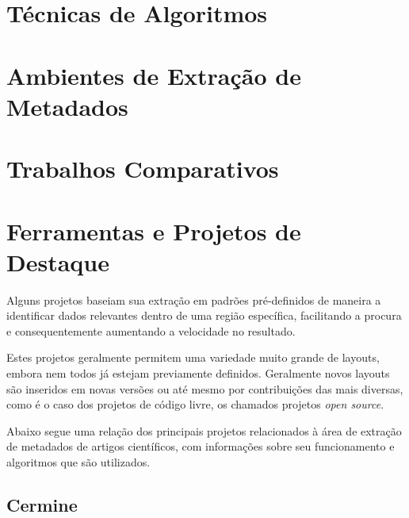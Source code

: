 \section{Técnicas de Algoritmos}

\section{Ambientes de Extração de Metadados}














\section{Trabalhos Comparativos}


\section{Ferramentas e Projetos de Destaque}

Alguns projetos baseiam sua extração em padrões pré-definidos de maneira a identificar dados relevantes dentro de uma região específica, facilitando a procura e consequentemente aumentando a velocidade no resultado. 

Estes projetos geralmente permitem uma variedade muito grande de layouts, embora nem todos já estejam previamente definidos. Geralmente novos layouts são inseridos em novas versões ou até mesmo por contribuições das mais diversas, como é o caso dos projetos de código livre, os chamados projetos \textit{open source}.

Abaixo segue uma relação dos principais projetos relacionados à área de extração de metadados de artigos científicos, com informações sobre seu funcionamento e algoritmos que são utilizados.

\subsection{Cermine}


